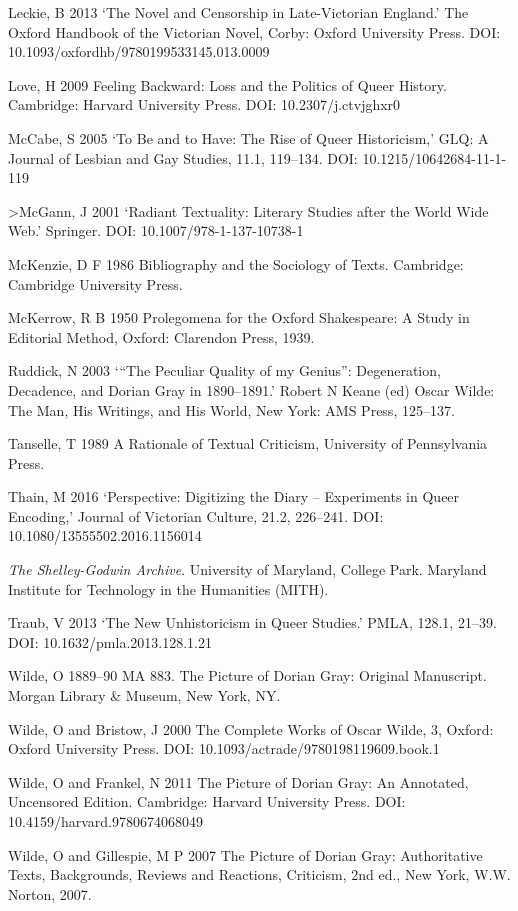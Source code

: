 \documentclass[11pt]{article}
\begin{document}
Leckie, B 2013 ‘The Novel and Censorship in Late-Victorian
England.' The Oxford Handbook of the Victorian Novel, Corby: Oxford
University Press. DOI: 10.1093/oxfordhb/9780199533145.013.0009

Love, H 2009 Feeling Backward: Loss and the Politics of Queer
History. Cambridge: Harvard University Press. DOI: 10.2307/j.ctvjghxr0

McCabe, S 2005 ‘To Be and to Have: The Rise of Queer
Historicism,' GLQ: A Journal of Lesbian and Gay Studies, 11.1, 119--134.
DOI: 10.1215/10642684-11-1-119

>McGann, J 2001 ‘Radiant Textuality: Literary Studies after the
World Wide Web.' Springer. DOI: 10.1007/978-1-137-10738-1

McKenzie, D F 1986 Bibliography and the Sociology of Texts.
Cambridge: Cambridge University Press.

McKerrow, R B 1950 Prolegomena for the Oxford Shakespeare: A
Study in Editorial Method, Oxford: Clarendon Press, 1939.

Ruddick, N 2003 ‘“The Peculiar Quality of my Genius”:
Degeneration, Decadence, and Dorian Gray in 1890--1891.' Robert N Keane
(ed) Oscar Wilde: The Man, His Writings, and His World, New York: AMS
Press, 125--137.

Tanselle, T 1989 A Rationale of Textual Criticism, University
of Pennsylvania Press.

Thain, M 2016 ‘Perspective: Digitizing the Diary --
Experiments in Queer Encoding,' Journal of Victorian Culture, 21.2,
226--241. DOI: 10.1080/13555502.2016.1156014

\emph{The Shelley-Godwin Archive}. University of Maryland, College
Park. Maryland Institute for Technology in the Humanities (MITH).

Traub, V 2013 ‘The New Unhistoricism in Queer Studies.' PMLA,
128.1, 21--39. DOI: 10.1632/pmla.2013.128.1.21

Wilde, O 1889--90 MA 883. The Picture of Dorian Gray:
Original Manuscript. Morgan Library \& Museum, New York, NY.

Wilde, O and Bristow, J 2000 The Complete Works of Oscar
Wilde, 3, Oxford: Oxford University Press. DOI:
10.1093/actrade/9780198119609.book.1

Wilde, O and Frankel, N 2011 The Picture of Dorian Gray: An
Annotated, Uncensored Edition. Cambridge: Harvard University Press. DOI:
10.4159/harvard.9780674068049

Wilde, O and Gillespie, M P 2007 The Picture of Dorian Gray:
Authoritative Texts, Backgrounds, Reviews and Reactions, Criticism, 2nd
ed., New York, W.W. Norton, 2007.
\end{document}
